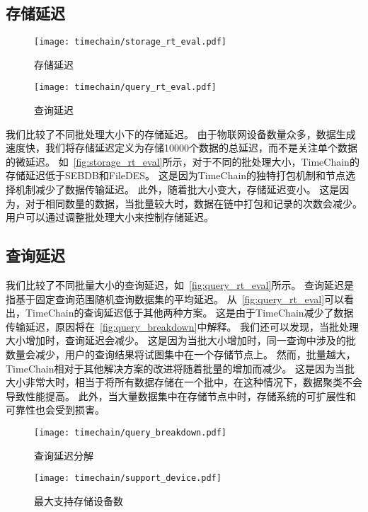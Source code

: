 \subsection{存储延迟}
\begin{figure*}[t]
    \centering
	\begin{minipage}{0.48\linewidth}
        \centering
        \texttt{[image: timechain/storage\_rt\_eval.pdf]}
        \caption{存储延迟}
        \label{fig:storage_rt_eval}
    \end{minipage}
    \quad
    \begin{minipage}{0.48\linewidth}
        \centering
        \texttt{[image: timechain/query\_rt\_eval.pdf]}
        \caption{查询延迟}
        \label{fig:query_rt_eval}
	\end{minipage}
\end{figure*}
我们比较了不同批处理大小下的存储延迟。
由于物联网设备数量众多，数据生成速度快，我们将存储延迟定义为存储10000个数据的总延迟，而不是关注单个数据的微延迟。
如~\autoref{fig:storage_rt_eval}所示，对于不同的批处理大小，TimeChain的存储延迟低于SEBDB和FileDES。
这是因为TimeChain的独特打包机制和节点选择机制减少了数据传输延迟。
此外，随着批大小变大，存储延迟变小。
这是因为，对于相同数量的数据，当批量较大时，数据在链中打包和记录的次数会减少。
用户可以通过调整批处理大小来控制存储延迟。

\subsection{查询延迟}
我们比较了不同批量大小的查询延迟，如~\autoref{fig:query_rt_eval}所示。
查询延迟是指基于固定查询范围随机查询数据集的平均延迟。
从~\autoref{fig:query_rt_eval}可以看出，TimeChain的查询延迟低于其他两种方案。
这是由于TimeChain减少了数据传输延迟，原因将在~\autoref{fig:query_breakdown}中解释。
我们还可以发现，当批处理大小增加时，查询延迟会减少。
这是因为当批大小增加时，同一查询中涉及的批数量会减少，用户的查询结果将试图集中在一个存储节点上。
然而，批量越大，TimeChain相对于其他解决方案的改进将随着批量的增加而减少。
这是因为当批大小非常大时，相当于将所有数据存储在一个批中，在这种情况下，数据聚类不会导致性能提高。
此外，当大量数据集中在存储节点中时，存储系统的可扩展性和可靠性也会受到损害。

\begin{figure*}[t]
    \centering
    \begin{minipage}{0.48\linewidth}
        \centering
        \texttt{[image: timechain/query\_breakdown.pdf]}
        \caption{查询延迟分解}
        \label{fig:query_breakdown}
	\end{minipage}
	\quad
	\begin{minipage}{0.48\linewidth}
        \centering
        \texttt{[image: timechain/support\_device.pdf]}
        \caption{最大支持存储设备数}
        \label{fig:support_device}
    \end{minipage}
\end{figure*}

